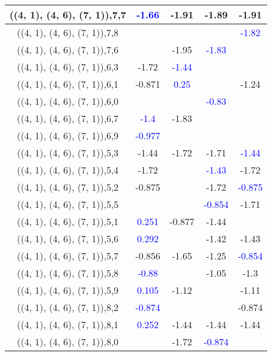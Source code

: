 \documentclass{article}
\begin{document}
\begin{center}
\begin{longtable}{|c|c|c|c|c|}
        	((4, 1), (4, 6), (7, 1)),7,7& \textcolor{blue}{-1.66}&-1.91&-1.89&-1.91\\
        	\hline
        	((4, 1), (4, 6), (7, 1)),7,8&&&& \textcolor{blue}{-1.82}\\
        	\hline
        	((4, 1), (4, 6), (7, 1)),7,6&&-1.95& \textcolor{blue}{-1.83}&\\
        	\hline
        	((4, 1), (4, 6), (7, 1)),6,3&-1.72& \textcolor{blue}{-1.44}&&\\
        	\hline
        	((4, 1), (4, 6), (7, 1)),6,1&-0.871& \textcolor{blue}{0.25}&&-1.24\\
        	\hline
        	((4, 1), (4, 6), (7, 1)),6,0&&& \textcolor{blue}{-0.83}&\\
        	\hline
        	((4, 1), (4, 6), (7, 1)),6,7& \textcolor{blue}{-1.4}&-1.83&&\\
        	\hline
        	((4, 1), (4, 6), (7, 1)),6,9& \textcolor{blue}{-0.977}&&&\\
        	\hline
        	((4, 1), (4, 6), (7, 1)),5,3&-1.44&-1.72&-1.71& \textcolor{blue}{-1.44}\\
        	\hline
        	((4, 1), (4, 6), (7, 1)),5,4&-1.72&& \textcolor{blue}{-1.43}&-1.72\\
        	\hline
        	((4, 1), (4, 6), (7, 1)),5,2&-0.875&&-1.72& \textcolor{blue}{-0.875}\\
        	\hline
        	((4, 1), (4, 6), (7, 1)),5,5&&& \textcolor{blue}{-0.854}&-1.71\\
        	\hline
        	((4, 1), (4, 6), (7, 1)),5,1& \textcolor{blue}{0.251}&-0.877&-1.44&\\
        	\hline
        	((4, 1), (4, 6), (7, 1)),5,6& \textcolor{blue}{0.292}&&-1.42&-1.43\\
        	\hline
        	((4, 1), (4, 6), (7, 1)),5,7&-0.856&-1.65&-1.25& \textcolor{blue}{-0.854}\\
        	\hline
        	((4, 1), (4, 6), (7, 1)),5,8& \textcolor{blue}{-0.88}&&-1.05&-1.3\\
        	\hline
        	((4, 1), (4, 6), (7, 1)),5,9& \textcolor{blue}{0.105}&-1.12&&-1.11\\
        	\hline
        	((4, 1), (4, 6), (7, 1)),8,2& \textcolor{blue}{-0.874}&&&-0.874\\
        	\hline
        	((4, 1), (4, 6), (7, 1)),8,1& \textcolor{blue}{0.252}&-1.44&-1.44&-1.44\\
        	\hline
        	((4, 1), (4, 6), (7, 1)),8,0&&-1.72& \textcolor{blue}{-0.874}&\\

\end{longtable}
\end{center}
\end{document}
